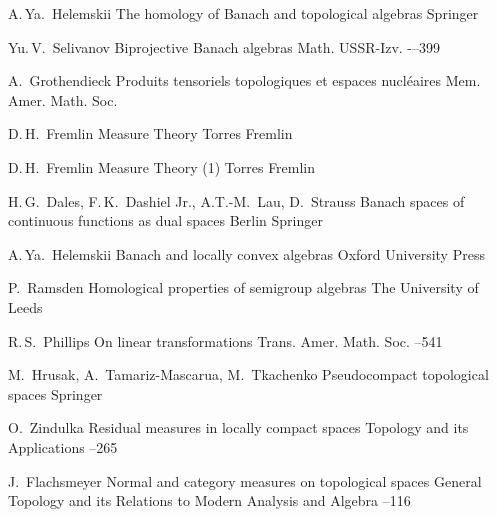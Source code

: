 \documentclass[12pt]{article}
\numberwithin{equation}{subsection}
\theoremstyle{plain}
\begin{document}
\begin{thebibliography}{99}

     \by A.\,Ya.~Helemskii \book The homology of
    Banach and topological algebras \publ Springer 

     \by Yu.\,V.~Selivanov \paper Biprojective
    Banach algebras \jour Math. USSR-Izv.    -–399

     \by A.~Grothendieck \paper Produits
    tensoriels topologiques et espaces nucl{\'e}aires \jour Mem. Amer. Math.
    Soc.  

     \by D.\,H.~Fremlin \book Measure Theory  \publ
    Torres Fremlin 

     \by D.\,H.~Fremlin \book Measure Theory (1)
    \publ Torres Fremlin 

     \by H.\,G.~Dales, F.\,K.~Dashiel Jr.,
    A.T.-M.~Lau, D.~Strauss \book Banach spaces of continuous functions as dual
    spaces \publaddr Berlin \publ Springer 

     \by A.\,Ya.~Helemskii \book Banach and locally
    convex algebras \publ Oxford University Press 

     \by P.~Ramsden \book Homological
    properties of semigroup algebras \publaddr The University of Leeds 

     \by R.\,S.~Phillips \paper On linear
    transformations \jour Trans. Amer. Math. Soc.   --541

     \by M.~Hrusak, A.~Tamariz-Mascarua,
    M.~Tkachenko \book Pseudocompact topological spaces \publ Springer 

     \by O.~Zindulka \paper Residual measures in
    locally compact spaces \jour Topology and its Applications    --265

    \by J.~Flachsmeyer \paper Normal and category measures on topological spaces
    \jour General Topology and its Relations to Modern Analysis and Algebra  --116

\end{thebibliography}
\end{document}
